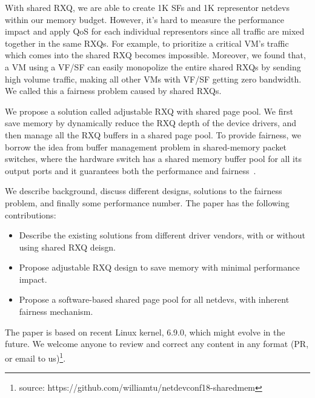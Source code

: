 \documentclass[letterpaper]{article}
\begin{document}
With shared RXQ, we are able to create 1K SFs and 1K representor netdevs
within our memory budget. However, it's hard to measure the performance
impact and apply QoS for each individual representors since all traffic
are mixed together in the same RXQs. For example, to prioritize a critical
VM's traffic which comes into the shared RXQ becomes impossible.
Moreover, we found that, a VM using a VF/SF can easily monopolize the
entire shared RXQs by sending high volume traffic,
making all other VMs with VF/SF getting zero bandwidth.
We called this a fairness problem caused by shared RXQs.


We propose a solution called adjustable RXQ with shared page pool.
We first save memory by dynamically reduce the RXQ depth of the
device drivers, and then manage all the RXQ buffers in a shared
page pool. To provide fairness, we borrow the idea from buffer management
problem in shared-memory packet switches, where the hardware switch
has a shared memory buffer pool for all its output ports and it
guarantees both the performance and fairness~\cite{devlinksb, queuelength}.

We describe background, discuss different designs, solutions to the fairness
problem, and finally some performance number. The paper has the following contributions:
\begin{itemize}
    \item Describe the existing solutions from different driver vendors,
          with or without using shared RXQ deisgn.
    \item Propose adjustable RXQ design to save memory with minimal performance impact.
    \item Propose a software-based shared page pool for all netdevs,
          with inherent fairness mechanism.
\end{itemize}
The paper is based on recent Linux kernel, 6.9.0, which might evolve in the future.
We welcome anyone to review and correct any content in any format (PR, or email to us)\footnote{source: https://github.com/williamtu/netdevconf18-sharedmem}.
\end{document}
